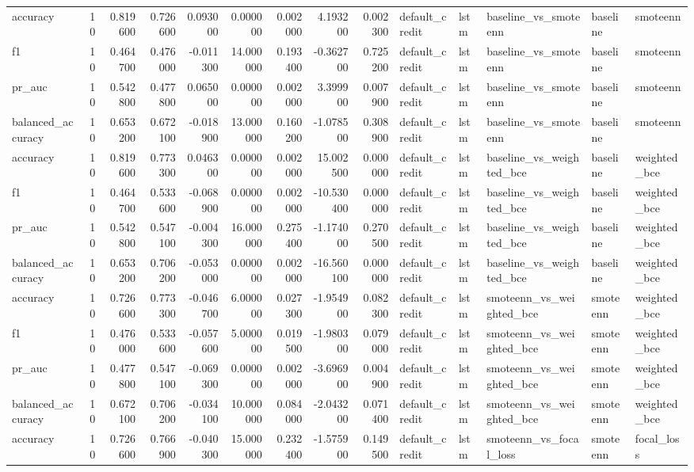 \begin{tabular}{lrrrrrrrrlllll}
accuracy & 10 & 0.819600 & 0.726600 & 0.093000 & 0.000000 & 0.002000 & 4.193200 & 0.002300 & default_credit & lstm & baseline_vs_smoteenn & baseline & smoteenn \\
f1 & 10 & 0.464700 & 0.476000 & -0.011300 & 14.000000 & 0.193400 & -0.362700 & 0.725200 & default_credit & lstm & baseline_vs_smoteenn & baseline & smoteenn \\
pr_auc & 10 & 0.542800 & 0.477800 & 0.065000 & 0.000000 & 0.002000 & 3.399900 & 0.007900 & default_credit & lstm & baseline_vs_smoteenn & baseline & smoteenn \\
balanced_accuracy & 10 & 0.653200 & 0.672100 & -0.018900 & 13.000000 & 0.160200 & -1.078500 & 0.308900 & default_credit & lstm & baseline_vs_smoteenn & baseline & smoteenn \\
accuracy & 10 & 0.819600 & 0.773300 & 0.046300 & 0.000000 & 0.002000 & 15.002500 & 0.000000 & default_credit & lstm & baseline_vs_weighted_bce & baseline & weighted_bce \\
f1 & 10 & 0.464700 & 0.533600 & -0.068900 & 0.000000 & 0.002000 & -10.530400 & 0.000000 & default_credit & lstm & baseline_vs_weighted_bce & baseline & weighted_bce \\
pr_auc & 10 & 0.542800 & 0.547100 & -0.004300 & 16.000000 & 0.275400 & -1.174000 & 0.270500 & default_credit & lstm & baseline_vs_weighted_bce & baseline & weighted_bce \\
balanced_accuracy & 10 & 0.653200 & 0.706200 & -0.053000 & 0.000000 & 0.002000 & -16.560100 & 0.000000 & default_credit & lstm & baseline_vs_weighted_bce & baseline & weighted_bce \\
accuracy & 10 & 0.726600 & 0.773300 & -0.046700 & 6.000000 & 0.027300 & -1.954900 & 0.082300 & default_credit & lstm & smoteenn_vs_weighted_bce & smoteenn & weighted_bce \\
f1 & 10 & 0.476000 & 0.533600 & -0.057600 & 5.000000 & 0.019500 & -1.980300 & 0.079000 & default_credit & lstm & smoteenn_vs_weighted_bce & smoteenn & weighted_bce \\
pr_auc & 10 & 0.477800 & 0.547100 & -0.069300 & 0.000000 & 0.002000 & -3.696900 & 0.004900 & default_credit & lstm & smoteenn_vs_weighted_bce & smoteenn & weighted_bce \\
balanced_accuracy & 10 & 0.672100 & 0.706200 & -0.034100 & 10.000000 & 0.084000 & -2.043200 & 0.071400 & default_credit & lstm & smoteenn_vs_weighted_bce & smoteenn & weighted_bce \\
accuracy & 10 & 0.726600 & 0.766900 & -0.040300 & 15.000000 & 0.232400 & -1.575900 & 0.149500 & default_credit & lstm & smoteenn_vs_focal_loss & smoteenn & focal_loss \\

\end{tabular}
